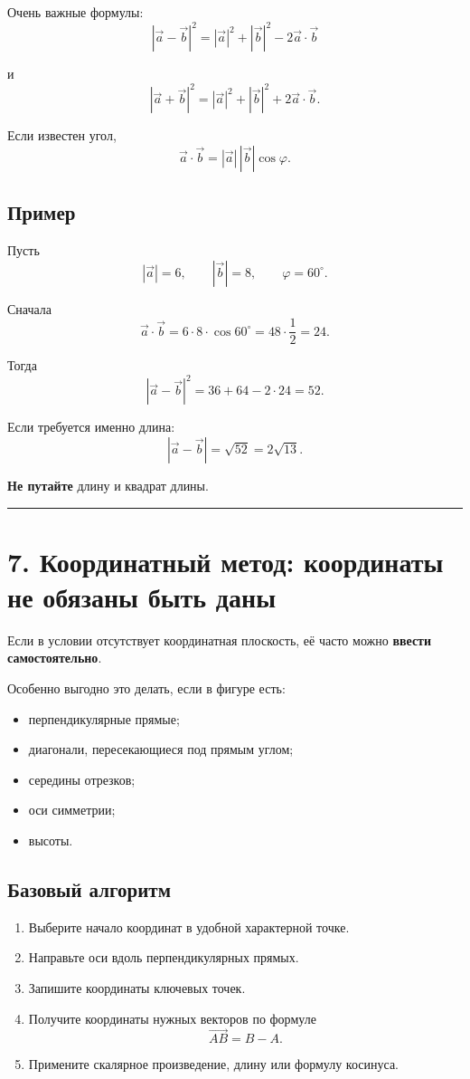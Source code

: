 \documentclass[a4paper,12pt]{article}
\newcommand{\vect}[1]{\overrightarrow{#1}}
\newcommand{\vct}[1]{\vec{#1}}
\newcommand{\sectionline}{%
    \par\noindent
    {\color{linegray}\rule{\linewidth}{0.5pt}}
    \par
}
\begin{document}
Очень важные формулы:
\[
\boxed{
|\vct a-\vct b|^2
=
|\vct a|^2
+
|\vct b|^2
-
2\vct a\cdot\vct b
}
\]

и
\[
\boxed{
|\vct a+\vct b|^2
=
|\vct a|^2
+
|\vct b|^2
+
2\vct a\cdot\vct b
}.
\]

Если известен угол,
\[
\vct a\cdot\vct b
=
|\vct a|\,|\vct b|\cos\varphi.
\]

\subsection*{\color{accent}Пример}

Пусть
\[
|\vct a|=6,
\qquad
|\vct b|=8,
\qquad
\varphi=60^\circ.
\]

Сначала
\[
\vct a\cdot\vct b
=
6\cdot8\cdot\cos60^\circ
=
48\cdot\frac12
=
24.
\]

Тогда
\[
|\vct a-\vct b|^2
=
36+64-2\cdot24
=
\boxed{52}.
\]

Если требуется именно длина:
\[
|\vct a-\vct b|
=
\sqrt{52}
=
\boxed{2\sqrt{13}}.
\]

\textbf{Не путайте} длину и квадрат длины.

\sectionline

\section*{\color{darkaccent}7. Координатный метод: координаты не обязаны быть даны}

Если в условии отсутствует координатная плоскость, её часто можно
\textbf{ввести самостоятельно}.

Особенно выгодно это делать, если в фигуре есть:

\begin{itemize}
    \item перпендикулярные прямые;
    \item диагонали, пересекающиеся под прямым углом;
    \item середины отрезков;
    \item оси симметрии;
    \item высоты.
\end{itemize}

\subsection*{\color{accent}Базовый алгоритм}

\begin{enumerate}
    \item Выберите начало координат в удобной характерной точке.
    \item Направьте оси вдоль перпендикулярных прямых.
    \item Запишите координаты ключевых точек.
    \item Получите координаты нужных векторов по формуле
    \[
    \vect{AB}=B-A.
    \]
    \item Примените скалярное произведение, длину или формулу косинуса.
\end{enumerate}
\end{document}
